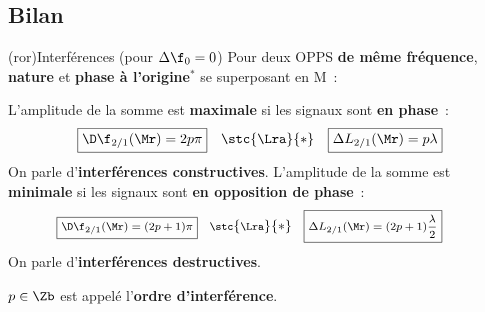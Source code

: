 \documentclass[../../main/main.tex]{subfiles}
\begin{document}
\subsection{Bilan}

\begin{tcb}[breakable](ror){Interférences (pour $\Delta{\f_0} = 0$)}
	Pour deux OPPS \textbf{de même fréquence}, \textbf{nature} et \textbf{phase à
		l'origine}$^*$ se superposant en M~:
	\begin{isd}
		L'amplitude de la somme est \textbf{maximale} si les signaux sont
		\textbf{en phase}~:
		\[
			\boxed{\D\f_{2/1}(\Mr) = 2p\pi}
			\quad \stc{\Lra}{*} \quad
			\boxed{\Delta{L}_{2/1}(\Mr) = p\lambda}
		\]
		On parle d'\textbf{interférences constructives}.
		\tcblower
		L'amplitude de la somme est \textbf{minimale} si les signaux sont
		\textbf{en opposition de phase}~:
		\[
			\footnotesize
			\hspace*{-15pt}
			\boxed{\D\f_{2/1}(\Mr) = (2p+1)\pi}
			\quad  \stc{\Lra}{*} \quad
			\boxed{\Delta{L}_{2/1}(\Mr) = (2p+1)\frac{\lambda}{2}}
		\]
		On parle d'\textbf{interférences destructives}.
	\end{isd}
	\centering$p\in\Zb$ est appelé l'\textbf{ordre d'interférence}.
\end{tcb}
\end{document}
